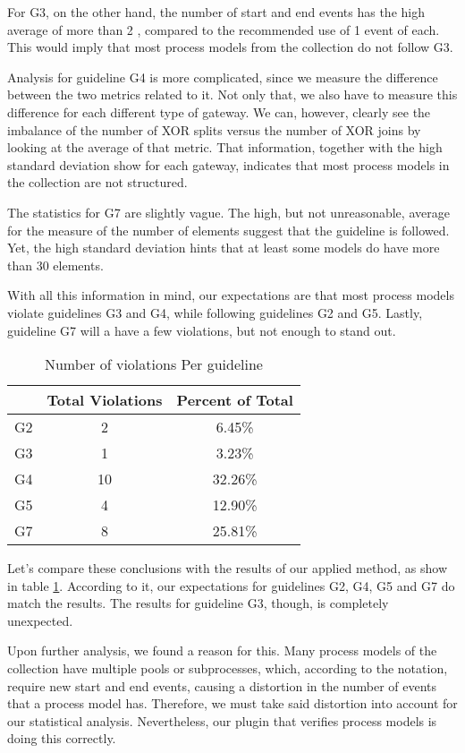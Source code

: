 \documentclass[a4paper,twoside]{article}
\begin{document}
For G3, on the other hand, the number of start and end events has the high average of more than 2 , compared to the recommended use of 1 event of each. This would imply that most process models from the collection do not follow G3. 

Analysis for guideline G4 is more complicated, since we measure the difference between the two metrics related to it. Not only that, we also have to measure this difference for each different type of gateway. We can, however, clearly see the imbalance of the number of XOR splits versus the number of XOR joins by looking at the average of that metric. That information, together with the high standard deviation show for each gateway, indicates that most process models in the collection are not structured.

The statistics for G7 are slightly vague. The high, but not unreasonable, average for the measure of the number of elements suggest that the guideline is followed. Yet, the high standard deviation hints that at least some models do have more than 30 elements.

With all this information in mind, our expectations are that most process models violate guidelines G3 and G4, while following guidelines G2 and G5. Lastly, guideline G7 will a have a few violations, but not enough to stand out.

\begin{table}[h]
	\centering
	\caption{Number of violations Per guideline}
	\label{ViolationsPerGuideline}
	\begin{tabular}{|c|c|c|}
		\hline
		& Total Violations & Percent of Total \\ \hline
		G2 & 2 & 6.45\% \\ \hline
		G3 & 1 & 3.23\% \\ \hline
		G4 & 10 & 32.26\% \\ \hline %
		G5 & 4 & 12.90\% \\ \hline
		G7 & 8 & 25.81\% \\ \hline
	\end{tabular}
\end{table}

Let's compare these conclusions with the results of our applied method, as show in table \ref{ViolationsPerGuideline}. According to it, our expectations for guidelines G2, G4, G5 and G7 do match the results. The results for guideline G3, though, is completely unexpected. 

Upon further analysis, we found a reason for this. Many process models of the collection have multiple pools or subprocesses, which, according to the notation, require new start and end events, causing a distortion in the number of events that a process model has. Therefore, we must take said distortion into account for our statistical analysis. Nevertheless, our plugin that verifies process models is doing this correctly.
\end{document}
